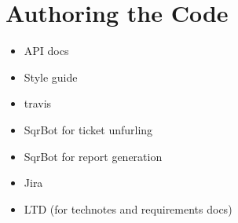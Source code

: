 \section{Authoring the Code}
\begin{itemize}
\item API docs
\item Style guide
\item travis
\item SqrBot for ticket unfurling
\item SqrBot for report generation
\item Jira
\item LTD (for technotes and requirements docs)
\end{itemize}
